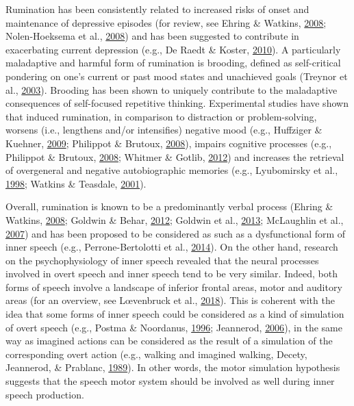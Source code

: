 \documentclass[a4paper,12pt,twoside,onecolumn,openright,final,oldfontcommands]{memoir}
\begin{document}
Rumination has been consistently related to increased risks of onset and maintenance of depressive episodes (for review, see Ehring \& Watkins, \protect\hyperlink{ref-ehring_repetitive_2008}{2008}; Nolen-Hoeksema et al., \protect\hyperlink{ref-Nolen-Hoeksema2008}{2008}) and has been suggested to contribute in exacerbating current depression (e.g., De Raedt \& Koster, \protect\hyperlink{ref-Raedt2010}{2010}). A particularly maladaptive and harmful form of rumination is brooding, defined as self-critical pondering on one's current or past mood states and unachieved goals (Treynor et al., \protect\hyperlink{ref-treynor_rumination_2003}{2003}). Brooding has been shown to uniquely contribute to the maladaptive consequences of self-focused repetitive thinking. Experimental studies have shown that induced rumination, in comparison to distraction or problem-solving, worsens (i.e., lengthens and/or intensifies) negative mood (e.g., Huffziger \& Kuehner, \protect\hyperlink{ref-Huffziger2009}{2009}; Philippot \& Brutoux, \protect\hyperlink{ref-Philippot2008}{2008}), impairs cognitive processes (e.g., Philippot \& Brutoux, \protect\hyperlink{ref-Philippot2008}{2008}; Whitmer \& Gotlib, \protect\hyperlink{ref-whitmer_switching_2012}{2012}) and increases the retrieval of overgeneral and negative autobiographic memories (e.g., Lyubomirsky et al., \protect\hyperlink{ref-Lyubomirsky1998}{1998}; Watkins \& Teasdale, \protect\hyperlink{ref-watkins_rumination_2001}{2001}).

Overall, rumination is known to be a predominantly verbal process (Ehring \& Watkins, \protect\hyperlink{ref-ehring_repetitive_2008}{2008}; Goldwin \& Behar, \protect\hyperlink{ref-goldwin_concreteness_2012}{2012}; Goldwin et al., \protect\hyperlink{ref-goldwin_concreteness_2013}{2013}; McLaughlin et al., \protect\hyperlink{ref-mclaughlin_effects_2007}{2007}) and has been proposed to be considered as such as a dysfunctional form of inner speech (e.g., Perrone-Bertolotti et al., \protect\hyperlink{ref-Perrone-Bertolotti2014}{2014}). On the other hand, research on the psychophysiology of inner speech revealed that the neural processes involved in overt speech and inner speech tend to be very similar. Indeed, both forms of speech involve a landscape of inferior frontal areas, motor and auditory areas (for an overview, see Lœvenbruck et al., \protect\hyperlink{ref-loevenbruck_cognitive_2018}{2018}). This is coherent with the idea that some forms of inner speech could be considered as a kind of simulation of overt speech (e.g., Postma \& Noordanus, \protect\hyperlink{ref-postma_production_1996}{1996}; Jeannerod, \protect\hyperlink{ref-jeannerod_motor_2006}{2006}), in the same way as imagined actions can be considered as the result of a simulation of the corresponding overt action (e.g., walking and imagined walking, Decety, Jeannerod, \& Prablanc, \protect\hyperlink{ref-decety_timing_1989}{1989}). In other words, the motor simulation hypothesis suggests that the speech motor system should be involved as well during inner speech production.
\end{document}
